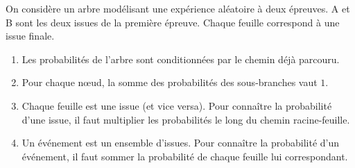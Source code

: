 \begin{exemple*}{}{}
	On considère un arbre modélisant une expérience aléatoire à deux épreuves.
	A et B sont les deux issues de la première épreuve. Chaque feuille correspond à une issue finale.
	\begin{center}
	\end{center}
\end{exemple*}


\begin{proprietes*}{}{}
	\begin{enumerate}[label=$\bullet$]
		\item Les probabilités de l'arbre sont conditionnées par le chemin déjà parcouru.
		\item Pour chaque nœud, la somme des probabilités des sous-branches vaut $1$.
		\item Chaque feuille est une issue (et vice versa). Pour connaître la probabilité d'une issue, il faut multiplier les probabilités le long du chemin racine-feuille.
		\item Un événement est un ensemble d'issues. Pour connaître la probabilité d'un événement, il faut sommer la probabilité de chaque feuille lui correspondant.
	\end{enumerate}
\end{proprietes*}




